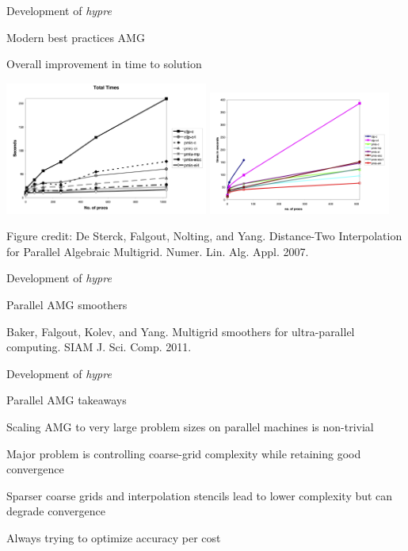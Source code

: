 \documentclass[18pt,xcolor=table]{beamer}
\begin{document}
\begin{frame}{Development of \emph{hypre}}
\begin{block}{Modern best practices AMG}
\bit
\item Overall improvement in time to solution
\eit
\begin{center}
\includegraphics[width=0.5\textwidth]{../figures/hypreImprovements1}
\includegraphics[width=0.45\textwidth]{../figures/hypreImprovements2}
\end{center}
\end{block}
\tiny{Figure credit: De Sterck, Falgout, Nolting, and Yang. Distance-Two Interpolation for Parallel Algebraic Multigrid. Numer. Lin. Alg. Appl. 2007.}
\end{frame}

\begin{frame}{Development of \emph{hypre}}
\begin{block}{Parallel AMG smoothers}
\bit
\item Baker, Falgout, Kolev, and Yang. Multigrid smoothers for ultra-parallel computing. SIAM J. Sci. Comp. 2011.
\eit
\end{block}
\end{frame}

\begin{frame}{Development of \emph{hypre}}
\begin{block}{Parallel AMG takeaways}
\bit
\item Scaling AMG to very large problem sizes on parallel machines is non-trivial
\item Major problem is controlling coarse-grid complexity while retaining good convergence
\item Sparser coarse grids and interpolation stencils lead to lower complexity but can degrade convergence
\item Always trying to optimize accuracy per cost
\eit
\end{block}
\end{frame}
\end{document}
